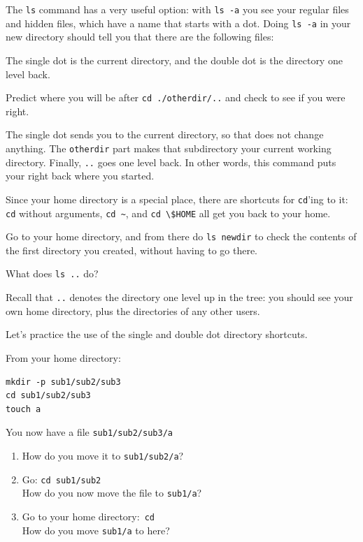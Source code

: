 The \lstinline{ls} command has a very useful option: with \lstinline{ls -a} you see
your regular files and hidden files, which have a name that starts
with a dot. Doing \lstinline{ls -a} in your new directory should tell you that
there are the following files:


The single dot is the
current directory, and the double dot is the directory one level
back. 

\begin{exercise}
  Predict where you will be after \lstinline{cd ./otherdir/..}  and check to
  see if you were right.
\end{exercise}
\begin{outcome}
  The single dot sends you to the current directory, so that does not
  change anything. The \lstinline{otherdir} part makes that subdirectory your
  current working directory. Finally, \lstinline{..} goes one level back. In
  other words, this command puts your right back where you started.
\end{outcome}

Since your home directory is a special place, there are shortcuts for
\lstinline{cd}'ing to it: \lstinline{cd} without arguments, \lstinline{cd ~}, and \lstinline{cd \$HOME}
  all get you back to your home.

Go to your home directory, and from there do \lstinline{ls newdir} to check
the contents of the first directory you created, without having to go
there.

\begin{exercise}
  What does \lstinline{ls ..} do?
\end{exercise}
\begin{outcome}
  Recall that \lstinline{..} denotes the directory one level up in the tree:
  you should see your own home directory, plus the directories of any
  other users.
\end{outcome}

Let's practice the use of the single and double dot directory shortcuts.

\begin{exercise}
From your home directory:
\begin{verbatim}
mkdir -p sub1/sub2/sub3
cd sub1/sub2/sub3
touch a
\end{verbatim}
You now have a file \lstinline{sub1/sub2/sub3/a}\\
\begin{enumerate}
\item
  How do you move it to \lstinline{sub1/sub2/a}?
\item Go: \lstinline{cd sub1/sub2}\\
  How do you now move the file to \lstinline{sub1/a}?
\item Go to your home directory:~\lstinline{cd}\\
  How do you move \lstinline{sub1/a} to here?
\end{enumerate}
\end{exercise}

